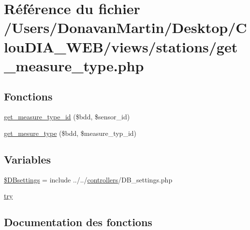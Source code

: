 \hypertarget{get__measure__type_8php}{}\section{Référence du fichier /\+Users/\+Donavan\+Martin/\+Desktop/\+Clou\+D\+I\+A\+\_\+\+W\+E\+B/views/stations/get\+\_\+measure\+\_\+type.php}
\label{get__measure__type_8php}
\subsection*{Fonctions}
\begin{DoxyCompactItemize}
\item 
\hyperlink{get__measure__type_8php_a02e9826cf650ea93986e46d4f26c6746}{get\+\_\+measure\+\_\+type\+\_\+id} (\$bdd, \$sensor\+\_\+id)
\item 
\hyperlink{get__measure__type_8php_a854e179a5aad8a1940ff1835c9d9fe2c}{get\+\_\+mesure\+\_\+type} (\$bdd, \$measure\+\_\+typ\+\_\+id)
\end{DoxyCompactItemize}
\subsection*{Variables}
\begin{DoxyCompactItemize}
\item 
\hyperlink{get__measure__type_8php_a9d97b484ee351b8e6034d74504996e9f}{\$\+D\+Bsettings} = include \textquotesingle{}../../\hyperlink{index_8js_ae15548a4836771e65070b7b408b2d46a}{controllers}/D\+B\+\_\+settings.\+php\textquotesingle{}
\item 
\hyperlink{get__measure__type_8php_abe4cc9788f52e49485473dc699537388}{try}
\end{DoxyCompactItemize}


\subsection{Documentation des fonctions}
\hypertarget{get__measure__type_8php_a02e9826cf650ea93986e46d4f26c6746}{}
